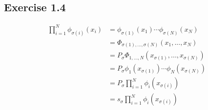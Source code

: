 \documentclass[norsk, 12pt]{article}
\title{}
\begin{document}
\subsection{Exercise 1.4}

\begin{align*}
	\prod_{i=1}^N \phi_{\sigma(i)} (x_i)
	&= \phi_{\sigma(1)} (x_1)\cdots \phi_{\sigma(N)} (x_N)\\
	&=\Phi_{\sigma(1),...,\sigma(N)}(x_1,...,x_N)\\
	&=P_{\sigma}\Phi_{1,...,N}(x_{\sigma(1)},...,x_{\sigma(N)})\\
	&=P_{\sigma} \phi_1 (x_{\sigma(1)})\cdots \phi_N(x_{\sigma(N)})\\
	&=P_{\sigma} \prod_{i=1}^N \phi_i (x_{\sigma(i)})\\
	&=s_{\sigma} \prod_{i=1}^N \phi_i (x_{\sigma(i)})
\end{align*}
\end{document}
